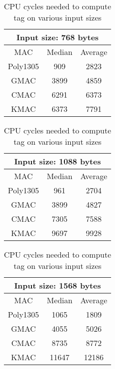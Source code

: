 \documentclass[journal=tches,submission]{iacrtrans}
\begin{document}
\begin{table}[H]
    \centering
    \footnotesize
    \caption{CPU cycles needed to compute tag on various input sizes}\label{tbl:mac-performance}
    \begin{tabular}{|c|c|c|}
        \hline
        \multicolumn{3}{|c|}{\bf Input size: 768 bytes} \\
        \hline
        MAC & Median & Average \\
        \hline
        Poly1305 & 909 & 2823 \\
        \hline
        GMAC & 3899 & 4859 \\
        \hline
        CMAC & 6291 & 6373 \\
        \hline
        KMAC & 6373 & 7791 \\
        \hline
    \end{tabular}
    \begin{tabular}{|c|c|c|}
        \hline
        \multicolumn{3}{|c|}{\bf Input size: 1088 bytes} \\
        \hline
        MAC & Median & Average \\
        \hline
        Poly1305 & 961 & 2704 \\
        \hline
        GMAC & 3899 & 4827 \\
        \hline
        CMAC & 7305 & 7588 \\
        \hline
        KMAC & 9697 & 9928 \\
        \hline
    \end{tabular}
    \begin{tabular}{|c|c|c|}
        \hline
        \multicolumn{3}{|c|}{\bf Input size: 1568 bytes} \\
        \hline
        MAC & Median & Average \\
        \hline
        Poly1305 & 1065 & 1809 \\
        \hline
        GMAC & 4055 & 5026 \\
        \hline
        CMAC & 8735 & 8772 \\
        \hline
        KMAC & 11647 & 12186 \\
        \hline
    \end{tabular}
\end{table}
\end{document}
